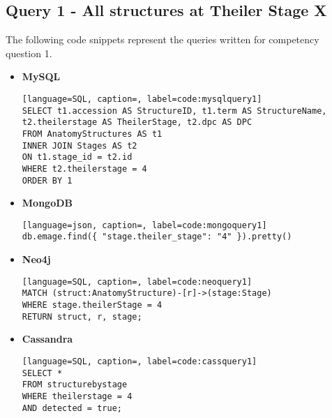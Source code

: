 \subsection*{Query 1 - All structures at Theiler Stage X}\label{query1}
The following code snippets represent the queries written for competency question 1.
\begin{itemize}
\item \textbf{MySQL}
\begin{lstlisting}[language=SQL, caption=, label=code:mysqlquery1]
SELECT t1.accession AS StructureID, t1.term AS StructureName, t2.theilerstage AS TheilerStage, t2.dpc AS DPC
FROM AnatomyStructures AS t1
INNER JOIN Stages AS t2
ON t1.stage_id = t2.id
WHERE t2.theilerstage = 4
ORDER BY 1
\end{lstlisting}
\item \textbf{MongoDB}
\begin{lstlisting}[language=json, caption=, label=code:mongoquery1]
db.emage.find({ "stage.theiler_stage": "4" }).pretty()
\end{lstlisting}
\item \textbf{Neo4j}
\begin{lstlisting}[language=SQL, caption=, label=code:neoquery1]
MATCH (struct:AnatomyStructure)-[r]->(stage:Stage)
WHERE stage.theilerStage = 4
RETURN struct, r, stage;
\end{lstlisting}
\item \textbf{Cassandra}
\begin{lstlisting}[language=SQL, caption=, label=code:cassquery1]
SELECT *
FROM structurebystage
WHERE theilerstage = 4
AND detected = true;
\end{lstlisting}
\end{itemize}

